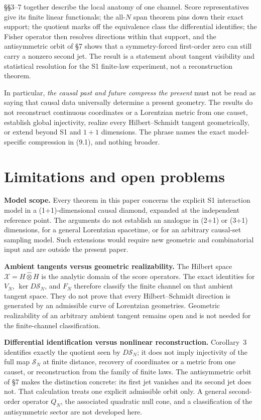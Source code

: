 \documentclass[11pt]{article}
\begin{document}
\S\S3--7 together describe the local anatomy of one channel. Score representatives give its finite linear functionals; the all-\(N\) span theorem pins down their exact support; the quotient marks off the equivalence class the differential identifies; the Fisher operator then resolves directions within that support, and the antisymmetric orbit of \S7 shows that a symmetry-forced first-order zero can still carry a nonzero second jet. The result is a statement about tangent visibility and statistical resolution for the S1 finite-law experiment, not a reconstruction theorem.

In particular, \emph{the causal past and future compress the present} must not be read as saying that causal data universally determine a present geometry. The results do not reconstruct continuous coordinates or a Lorentzian metric from one causet, establish global injectivity, realize every Hilbert--Schmidt tangent geometrically, or extend beyond S1 and \(1+1\) dimensions. The phrase names the exact model-specific compression in (9.1), and nothing broader.

\section{Limitations and open problems}

\textbf{Model scope.} Every theorem in this paper concerns the explicit S1 interaction model in a (1+1)-dimensional causal diamond, expanded at the independent reference point. The arguments do not establish an analogue in (2+1) or (3+1) dimensions, for a general Lorentzian spacetime, or for an arbitrary causal-set sampling model. Such extensions would require new geometric and combinatorial input and are outside the present paper.

\textbf{Ambient tangents versus geometric realizability.} The Hilbert space \(\mathcal X=H\widehat\otimes H\) is the analytic domain of the score operators. The exact identities for \(V_N\), \(\ker D\mathscr S_N\), and \(F_N\) therefore classify the finite channel on that ambient tangent space. They do not prove that every Hilbert--Schmidt direction is generated by an admissible curve of Lorentzian geometries. Geometric realizability of an arbitrary ambient tangent remains open and is not needed for the finite-channel classification.

\textbf{Differential identification versus nonlinear reconstruction.} Corollary~3 identifies exactly the quotient seen by \(D\mathscr S_N\); it does not imply injectivity of the full map \(\mathscr S_N\) at finite distance, recovery of coordinates or a metric from one causet, or reconstruction from the family of finite laws. The antisymmetric orbit of \S7 makes the distinction concrete: its first jet vanishes and its second jet does not. That calculation treats one explicit admissible orbit only. A general second-order operator \(Q_N\), the associated quadratic null cone, and a classification of the antisymmetric sector are not developed here.
\end{document}
